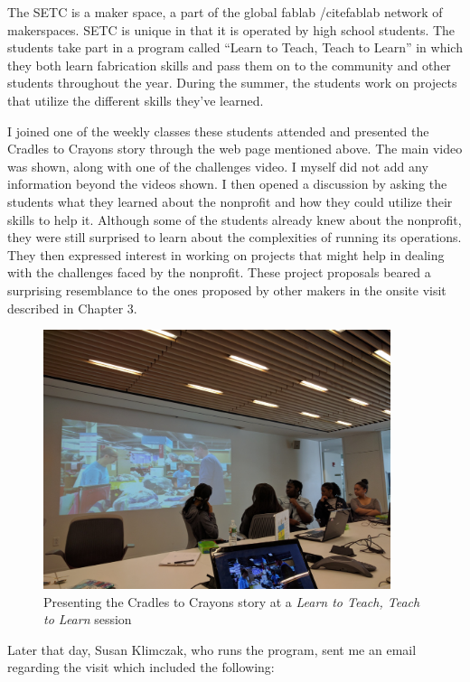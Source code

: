 
The SETC is a maker space, a part of the global fablab /cite{fablab} network of maker­spaces. SETC is unique in that it is operated by high school students. The students take part in a program called ``Learn to Teach, Teach to Learn'' in which they both learn fabrication skills and pass them on to the community and other students throughout the year. During the summer, the students work on projects that utilize the different skills they've learned.

I joined one of the weekly classes these students attended and presented the Cradles to Crayons story through the web page mentioned above. The main video was shown, along with one of the challenges video. I myself did not add any information beyond the videos shown. I then opened a discussion by asking the students what they learned about the nonprofit and how they could utilize their skills to help it. Although some of the students already knew about the nonprofit, they were still surprised to learn about the complexities of running its operations. They then expressed interest in working on projects that might help in dealing with the challenges faced by the nonprofit. These project proposals beared a surprising resemblance to the ones proposed by other makers in the onsite visit described in Chapter 3.

   \begin{figure}[thpb]
      \centering
      \includegraphics[width=4in]{figures/learn2teach.jpg}
      \caption{Presenting the Cradles to Crayons story at a \textit{Learn to Teach, Teach to Learn} session}
      \label{fig_setc}
   \end{figure}

Later that day, Susan Klimczak, who runs the program, sent me an email regarding the visit which included the following:

